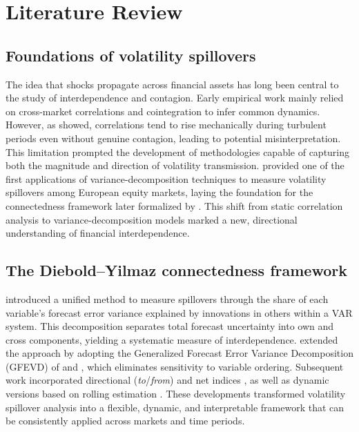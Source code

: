 \section{Literature Review}\label{sec:lit}

\subsection{Foundations of volatility spillovers}

The idea that shocks propagate across financial assets has long been central to the study
of interdependence and contagion. Early empirical work mainly relied on cross-market
correlations and cointegration to infer common dynamics. However, as
\citet{ForbesRigobon2002} showed, correlations tend to rise mechanically during turbulent
periods even without genuine contagion, leading to potential misinterpretation. This
limitation prompted the development of methodologies capable of capturing both the
magnitude and direction of volatility transmission. \citet{Yilmaz2006} provided one of
the first applications of variance-decomposition techniques to measure volatility
spillovers among European equity markets, laying the foundation for the connectedness
framework later formalized by \citet{DieboldYilmaz2009}. This shift from static
correlation analysis to variance-decomposition models marked a new, directional
understanding of financial interdependence.

\subsection{The Diebold--Yilmaz connectedness framework}

\citet{DieboldYilmaz2009} introduced a unified method to measure spillovers through the
share of each variable's forecast error variance explained by innovations in others within
a VAR system. This decomposition separates total forecast uncertainty into own and cross
components, yielding a systematic measure of interdependence. \citet{DieboldYilmaz2012}
extended the approach by adopting the Generalized Forecast Error Variance Decomposition
(GFEVD) of \citet{KoopPesaranShin1996} and \citet{PesaranShin1998}, which eliminates
sensitivity to variable ordering. Subsequent work incorporated directional
(\emph{to}/\emph{from}) and net indices \citep{DieboldYilmaz2014}, as well as dynamic
versions based on rolling estimation \citep{DieboldYilmaz2015}. These developments
transformed volatility spillover analysis into a flexible, dynamic, and interpretable
framework that can be consistently applied across markets and time periods.

